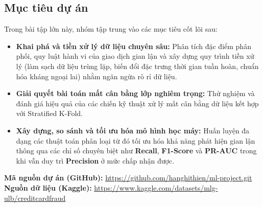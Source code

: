 \subsection{Mục tiêu dự án}
Trong bài tập lớn này, nhóm tập trung vào các mục tiêu cốt lõi sau:
\begin{itemize}
    \item \textbf{Khai phá và tiền xử lý dữ liệu chuyên sâu:} Phân tích đặc điểm phân phối, quy luật hành vi của giao dịch gian lận và xây dựng quy trình tiền xử lý (làm sạch dữ liệu trùng lặp, biến đổi đặc trưng thời gian tuần hoàn, chuẩn hóa kháng ngoại lai) nhằm ngăn ngừa rò rỉ dữ liệu.
    \item \textbf{Giải quyết bài toán mất cân bằng lớp nghiêm trọng:} Thử nghiệm và đánh giá hiệu quả của các chiến kỹ thuật xử lý mất cân bằng dữ liệu kết hợp với Stratified K-Fold.
    \item \textbf{Xây dựng, so sánh và tối ưu hóa mô hình học máy:} Huấn luyện đa dạng các thuật toán phân loại từ đó tối ưu hóa khả năng phát hiện gian lận thông qua các chỉ số chuyên biệt như \textbf{Recall}, \textbf{F1-Score} và \textbf{PR-AUC} trong khi vẫn duy trì \textbf{Precision} ở mức chấp nhận được.
\end{itemize}


\textbf{Mã nguồn dự án (GitHub):} \url{https://github.com/hanghithien/ml-project.git}
\textbf{Nguồn dữ liệu (Kaggle):} \url{https://www.kaggle.com/datasets/mlg-ulb/creditcardfraud}
